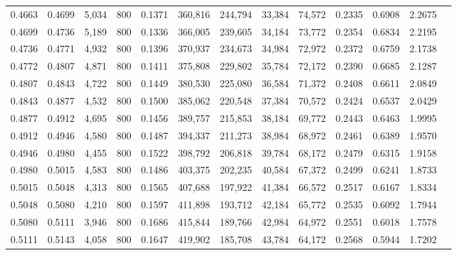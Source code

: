 \begin{tabular}{rrrrrrrrrrrrr}
0.4663 & 0.4699 &  5,034 & 800 &                                     0.1371 & 360,816 & 244,794 &  33,384 &  74,572 & 0.2335 & 0.6908 & 2.2675 \\
0.4699 & 0.4736 &  5,189 & 800 &                                     0.1336 & 366,005 & 239,605 &  34,184 &  73,772 & 0.2354 & 0.6834 & 2.2195 \\
0.4736 & 0.4771 &  4,932 & 800 &                                     0.1396 & 370,937 & 234,673 &  34,984 &  72,972 & 0.2372 & 0.6759 & 2.1738 \\
0.4772 & 0.4807 &  4,871 & 800 &                                     0.1411 & 375,808 & 229,802 &  35,784 &  72,172 & 0.2390 & 0.6685 & 2.1287 \\
0.4807 & 0.4843 &  4,722 & 800 &                                     0.1449 & 380,530 & 225,080 &  36,584 &  71,372 & 0.2408 & 0.6611 & 2.0849 \\
0.4843 & 0.4877 &  4,532 & 800 &                                     0.1500 & 385,062 & 220,548 &  37,384 &  70,572 & 0.2424 & 0.6537 & 2.0429 \\
0.4877 & 0.4912 &  4,695 & 800 &                                     0.1456 & 389,757 & 215,853 &  38,184 &  69,772 & 0.2443 & 0.6463 & 1.9995 \\
0.4912 & 0.4946 &  4,580 & 800 &                                     0.1487 & 394,337 & 211,273 &  38,984 &  68,972 & 0.2461 & 0.6389 & 1.9570 \\
0.4946 & 0.4980 &  4,455 & 800 &                                     0.1522 & 398,792 & 206,818 &  39,784 &  68,172 & 0.2479 & 0.6315 & 1.9158 \\
0.4980 & 0.5015 &  4,583 & 800 &                                     0.1486 & 403,375 & 202,235 &  40,584 &  67,372 & 0.2499 & 0.6241 & 1.8733 \\
0.5015 & 0.5048 &  4,313 & 800 &                                     0.1565 & 407,688 & 197,922 &  41,384 &  66,572 & 0.2517 & 0.6167 & 1.8334 \\
0.5048 & 0.5080 &  4,210 & 800 &                                     0.1597 & 411,898 & 193,712 &  42,184 &  65,772 & 0.2535 & 0.6092 & 1.7944 \\
0.5080 & 0.5111 &  3,946 & 800 &                                     0.1686 & 415,844 & 189,766 &  42,984 &  64,972 & 0.2551 & 0.6018 & 1.7578 \\
0.5111 & 0.5143 &  4,058 & 800 &                                     0.1647 & 419,902 & 185,708 &  43,784 &  64,172 & 0.2568 & 0.5944 & 1.7202 \\

\end{tabular}
